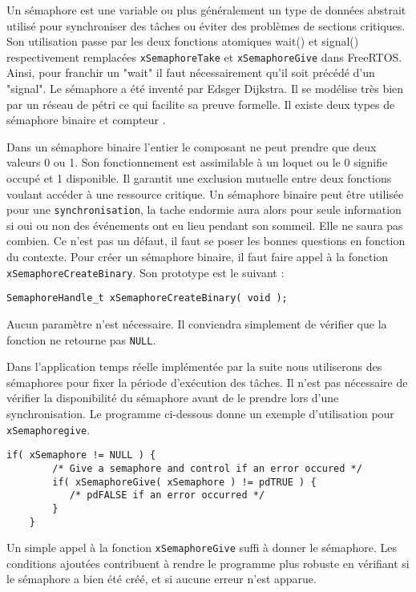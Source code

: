 Un sémaphore est une variable ou plus généralement un type de données abstrait utilisé pour synchroniser des tâches ou éviter des problèmes de sections critiques. 
Son utilisation passe par les deux fonctions atomiques wait() et signal() respectivement remplacées \texttt{xSemaphoreTake} et \texttt{xSemaphoreGive} dans FreeRTOS.
Ainsi, pour franchir un "wait" il faut nécessairement qu’il soit précédé d’un "signal". Le sémaphore a
été inventé par Edsger Dijkstra. Il se modélise très bien par un réseau de pétri ce qui facilite sa preuve
formelle. Il existe deux types de sémaphore binaire et compteur \cite{sem_wiki}.

Dans un sémaphore binaire l’entier le composant ne peut prendre que deux valeurs 0 ou 1. 
Son fonctionnement est assimilable à un loquet ou le 0 signifie occupé et 1 disponible. 
Il garantit une exclusion mutuelle entre deux fonctions voulant accéder à une ressource critique. 
Un sémaphore binaire peut être utilisée pour une \texttt{synchronisation}, la tache endormie aura alors pour seule information si oui ou non des événements ont eu lieu pendant son sommeil. 
Elle ne saura pas combien. 
Ce n’est pas un défaut, il faut se poser les bonnes questions en fonction du contexte. 
Pour créer un sémaphore binaire, il faut faire appel à la fonction \texttt{xSemaphoreCreateBinary}.
Son prototype est le suivant :
\begin{lstlisting}[style=CStyle]
    SemaphoreHandle_t xSemaphoreCreateBinary( void );
\end{lstlisting}
Aucun paramètre n'est nécessaire.
Il conviendra simplement de vérifier que la fonction ne retourne pas \texttt{NULL}.

Dans l'application temps réelle implémentée par la suite nous utiliserons des sémaphores pour fixer la période d'exécution des tâches.
Il n'est pas nécessaire de vérifier la disponibilité du sémaphore avant de le prendre lors d'une synchronisation.
Le programme ci-dessous donne un exemple d'utilisation pour \texttt{xSemaphoregive}.
\begin{lstlisting}[style=CStyle]
    if( xSemaphore != NULL ) {
        /* Give a semaphore and control if an error occured */
        if( xSemaphoreGive( xSemaphore ) != pdTRUE ) {
           /* pdFALSE if an error occurred */
        }
    }    
\end{lstlisting}
Un simple appel à la fonction \texttt{xSemaphoreGive} suffi à donner le sémaphore.
Les conditions ajoutées contribuent à rendre le programme plus robuste en vérifiant si le sémaphore a bien été créé, et si aucune erreur n'est apparue.

